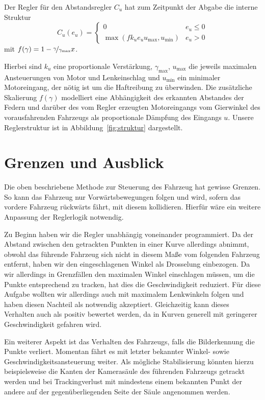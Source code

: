 \documentclass[10pt]{article}
\begin{document}
    Der Regler für den Abstandsregler $C_{u}$ hat zum Zeitpunkt der Abgabe die interne Struktur \[
    C_{u}(e_{u}) = \begin{cases} 0 & e_{u} \leq 0 \\
    \max (fk_{u}e_{u}u_{\max},u_{\min}) &  e_{u} > 0
    \end{cases}
    \]
    mit $f(\gamma) = 1 - \nicefrac{\gamma}{\gamma_{\max}}x$.

    Hierbei sind $k_{u}$ eine proportionale Verstärkung, $\gamma_{\max}$, $u_{\max}$ die jeweils maximalen Ansteuerungen von Motor und Lenkeinschlag und $u_{\min}$ ein minimaler Motoreingang, der nötig ist um die Haftreibung zu überwinden.
    Die zusätzliche Skalierung $f(\gamma)$ modelliert eine Abhängigkeit des erkannten Abstandes der Federn und darüber des vom Regler erzeugten Motoreingangs vom Gierwinkel des vorausfahrenden Fahrzeugs als proportionale Dämpfung des Eingangs $u$.
    Unsere Reglerstruktur ist in Abbildung~\ref{fig:struktur} dargestellt.


\section{Grenzen und Ausblick}
    Die oben beschriebene Methode zur Steuerung des Fahrzeug hat gewisse Grenzen.
    So kann das Fahrzeug nur Vorwärtsbewegungen folgen und wird, sofern das vordere Fahrzeug rückwärts fährt, mit diesem kollidieren. Hierfür wäre ein weitere Anpassung der Reglerlogik notwendig.

    Zu Beginn haben wir die Regler unabhängig voneinander programmiert.
    Da der Abstand zwischen den getrackten Punkten in einer Kurve allerdings abnimmt, obwohl das führende Fahrzeug sich nicht in diesem Maße vom folgenden Fahrzeug entfernt, haben wir den eingeschlagenen Winkel als Drosselung einbezogen.
    Da wir allerdings in Grenzfällen den maximalen Winkel einschlagen müssen, um die Punkte entsprechend zu tracken, hat dies die Geschwindigkeit reduziert.
    Für diese Aufgabe wollten wir allerdings auch mit maximalem Lenkwinkeln folgen und haben diesen Nachteil als notwendig akzeptiert. Gleichzeitig kann dieses Verhalten auch als positiv bewertet werden, da in Kurven generell mit geringerer Geschwindigkeit gefahren wird.

    Ein weiterer Aspekt ist das Verhalten des Fahrzeugs, falls die Bilderkennung die Punkte verliert.
    Momentan fährt es mit letzter bekannter Winkel- sowie Geschwindigkeitsansteuerung weiter.
    Als mögliche Stabilisierung könnten hierzu beispielsweise die Kanten der Kamerasäule des führenden Fahrzeugs getrackt werden und bei Trackingverlust mit mindestens einem bekannten Punkt der andere auf der gegenüberliegenden Seite der Säule angenommen werden.
\end{document}
